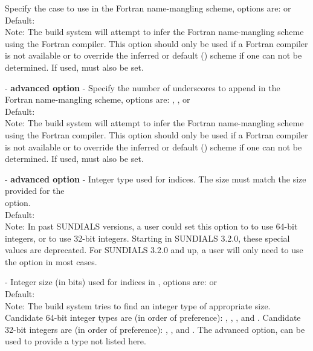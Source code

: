 \begin{description}
  Specify the case to use in the Fortran name-mangling scheme, options
  are:  or 
  \\
  Default:
  \\
  Note: The build system will attempt to infer the Fortran
  name-mangling scheme using the Fortran compiler. This option should
  only be used if a Fortran compiler is not available or to override
  the inferred or default () scheme if one can not be
  determined. If used,  must also
  be set.
\item[\id{SUNDIALS\_F77\_FUNC\_UNDERSCORES}] - \textbf{advanced option} -
  Specify the number of underscores to append in the Fortran
  name-mangling scheme, options are: , , or 
  \\
  Default:
  \\
  Note: The build system will attempt to infer the Fortran
  name-mangling scheme using the Fortran compiler. This option should
  only be used if a Fortran compiler is not available or to override
  the inferred or default () scheme if one can not be
  determined. If used,  must also be set.
\item[\id{SUNDIALS\_INDEX\_TYPE}] - \textbf{advanced option} -
  Integer type used for {\sundials} indices. The size must match the size provided for
  the \\ \noindent {} option.
  \\
  Default:
  \\
  Note:
  In past SUNDIALS versions, a user could set this option to  to use 64-bit
  integers, or  to use 32-bit integers. Starting in SUNDIALS 3.2.0, these
  special values are deprecated. For SUNDIALS 3.2.0 and up, a user will only need to use
  the  option in most cases.
\item[\id{SUNDIALS\_INDEX\_SIZE}] -
  Integer size (in bits) used for indices in {\sundials}, options are:  or 
  \\
  Default: 
  \\
  Note:
  The build system tries to find an integer type of appropriate size. Candidate 64-bit
  integer types are (in order of preference): , , , and .
  Candidate 32-bit integers are (in order of preference): , , and .
  The advanced option,  can be used to provide a type not listed here.

\end{description}
